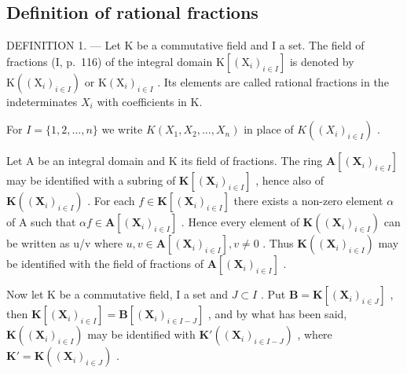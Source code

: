 \subsection{Definition of rational fractions}

DEFINITION 1. --- Let K be a commutative field and I a set. The field of fractions (I, p.~116) of the integral domain \(\mathrm{K}[(\mathrm{X}_{i})_{i\in I}]\) is denoted by \(\mathrm{K}((\mathrm{X}_{i})_{i\in I})\) or \(\mathrm{K}(\mathrm{X}_{i})_{i\in I}\) . Its elements are called rational fractions in the indeterminates \(X_{i}\) with coefficients in K.

For \(I = \{1, 2, \dots, n\}\) we write \(K(X_1, X_2, \dots, X_n)\) in place of \(K((X_i)_{i \in I})\) .

Let A be an integral domain and K its field of fractions. The ring \(\mathbf{A}[(\mathbf{X}_{i})_{i\in I}]\) may be identified with a subring of \(\mathbf{K}[(\mathbf{X}_{i})_{i\in I}]\) , hence also of \(\mathbf{K}((\mathbf{X}_{i})_{i\in I})\) . For each \(f\in\mathbf{K}[(\mathbf{X}_{i})_{i\in I}]\) there exists a non-zero element \(\alpha\) of A such that \(\alpha f\in\mathbf{A}[(\mathbf{X}_{i})_{i\in I}]\) . Hence every element of \(\mathbf{K}((\mathbf{X}_{i})_{i\in I})\) can be written as u/v where \(u,v\in\mathbf{A}[(\mathbf{X}_{i})_{i\in I}],v\neq0\) . Thus \(\mathbf{K}((\mathbf{X}_{i})_{i\in I})\) may be identified with the field of fractions of \(\mathbf{A}[(\mathbf{X}_{i})_{i\in I}]\) .

Now let K be a commutative field, I a set and \(J \subset I\) . Put \(\mathbf{B} = \mathbf{K}[(\mathbf{X}_i)_{i \in J}]\) , then \(\mathbf{K}[(\mathbf{X}_i)_{i \in I}] = \mathbf{B}[(\mathbf{X}_i)_{i \in I-J}]\) , and by what has been said, \(\mathbf{K}((\mathbf{X}_i)_{i \in I})\) may be identified with \(\mathbf{K}'((\mathbf{X}_i)_{i \in I-J})\) , where \(\mathbf{K}' = \mathbf{K}((\mathbf{X}_i)_{i \in J})\) .

